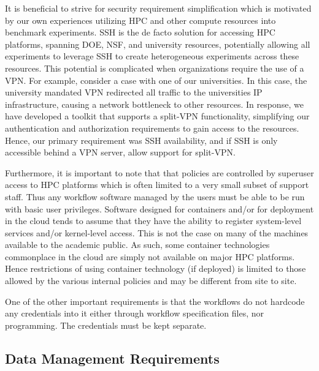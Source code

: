 \documentclass[sigconf]{acmart}
\begin{document}
It is beneficial to strive for security requirement simplification which is motivated by our own experiences utilizing HPC and other compute resources into benchmark experiments. SSH is the de facto solution for accessing HPC platforms, spanning DOE, NSF, and university resources, potentially allowing all experiments to leverage SSH to create heterogeneous experiments across these resources. This potential is complicated when organizations require the use of a VPN. For example, consider a case with one of our universities. In this case, the university mandated VPN redirected all traffic to the universities IP infrastructure, causing a network bottleneck to other resources. In response, we have developed a toolkit that supports a split-VPN functionality, simplifying our authentication and authorization requirements to gain access to the resources. Hence, our primary requirement was SSH availability, and if SSH is only accessible behind a VPN server, allow support for split-VPN.


Furthermore, it is important to note that that policies are controlled by superuser access to HPC platforms which is often limited to a very small subset of support staff. Thus any workflow software managed by the users must be able to be run with basic user privileges. Software designed for containers and/or for deployment in the cloud tends to assume that they have the ability to register system-level services and/or kernel-level access. This is not the case on many of the machines available to the academic public. As such, some container technologies commonplace in the cloud are simply not available on major HPC platforms. Hence restrictions of using container technology (if deployed) is limited to those allowed by the various internal policies and may be different from site to site. 

One of the other important requirements is that the workflows do not hardcode any credentials into it either through workflow specification files, nor programming. The credentials must be kept separate.


\subsection{Data Management Requirements}
\label{sec:data-requirements}
\end{document}
